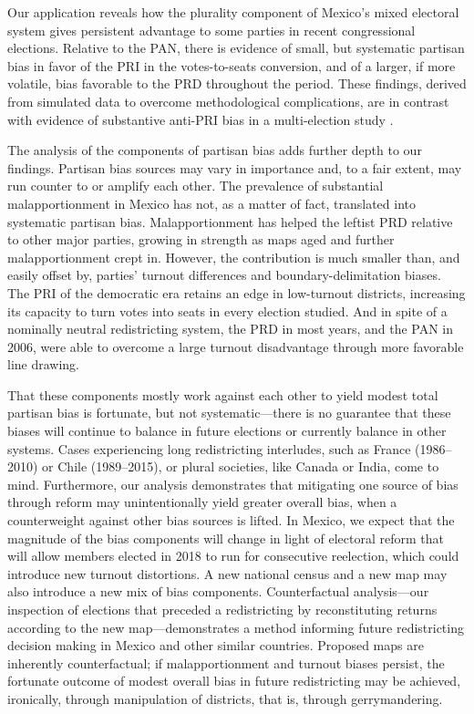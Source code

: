\documentclass[letter,12pt]{article}
\begin{document}
{Our application reveals how the plurality component of Mexico's mixed electoral system gives persistent advantage to some parties in recent congressional elections. Relative to the PAN, there is evidence of small, but systematic partisan bias in favor of the PRI in the votes-to-seats conversion, and of a larger, if more volatile, bias favorable to the PRD throughout the period. These findings, derived from simulated data to overcome methodological complications, are in contrast with evidence of substantive anti-PRI bias in a multi-election study \citep{marquez2014biasBlog}. 

The analysis of the components of partisan bias adds further depth to our findings. Partisan bias sources may vary in importance and, to a fair extent, may run counter to or amplify each other. The prevalence of substantial malapportionment in Mexico has not, as a matter of fact, translated into systematic partisan bias. Malapportionment has helped the leftist PRD relative to other major parties, growing in strength as maps aged and further malapportionment crept in. However, the contribution is much smaller than, and easily offset by, parties' turnout differences and boundary-delimitation biases. The PRI of the democratic era retains an edge in low-turnout districts, increasing its capacity to turn votes into seats in every election studied. And in spite of a nominally neutral redistricting system, the PRD in most years, and the PAN in 2006, were able to overcome a large turnout disadvantage through more favorable line drawing. 

That these components mostly work against each other to yield modest total partisan bias is fortunate, but not systematic---there is no guarantee that these biases will continue to balance in future elections or currently balance in other systems. Cases experiencing long redistricting interludes, such as France (1986--2010) or Chile (1989--2015), or plural societies, like Canada or India, come to mind. Furthermore, our analysis demonstrates that mitigating one source of bias through reform may unintentionally yield greater overall bias, when a counterweight against other bias sources is lifted. In Mexico, we expect that the magnitude of the bias components will change in light of electoral reform that will allow members elected in 2018 to run for consecutive reelection, which could introduce new turnout distortions. A new national census and a new map may also introduce a new mix of bias components. Counterfactual analysis---our inspection of elections that preceded a redistricting by reconstituting returns according to the new map---demonstrates a method informing future redistricting decision making in Mexico and other similar countries. Proposed maps are inherently counterfactual; if malapportionment and turnout biases persist, the fortunate outcome of modest overall bias in future redistricting may be achieved, ironically, through manipulation of districts, that is, through gerrymandering.

}
\end{document}
